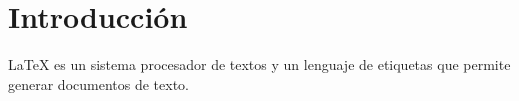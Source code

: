 \section{Introducción}
\LaTeX{} es un sistema procesador de textos y un lenguaje de etiquetas que permite generar documentos de texto.